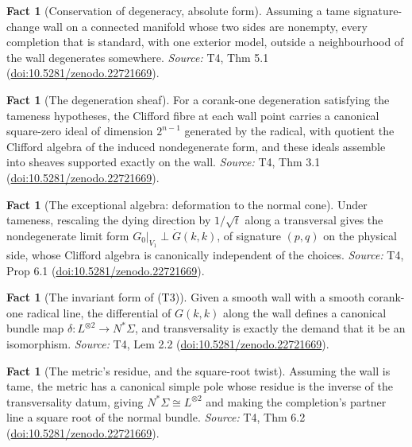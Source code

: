 \documentclass[11pt]{article}
\theoremstyle{definition}
\newtheorem{fact}[theorem]{Fact}
\theoremstyle{plain}
\providecommand{\Sig}{}\renewcommand{\Sig}{\Sigma}
\providecommand{\shL}{}\renewcommand{\shL}{L}
\begin{document}
\begin{fact}[Conservation of degeneracy, absolute form]\label{c:sheaf.conservation-degeneracy-absolute-form}
Assuming a tame signature-change wall on a connected manifold whose two sides are nonempty, every completion that is standard, with one exterior model, outside a neighbourhood of the wall degenerates somewhere.
\emph{Source:} T4, Thm 5.1 (\href{https://doi.org/10.5281/zenodo.22721669}{doi:10.5281/zenodo.22721669}).
\end{fact}

\begin{fact}[The degeneration sheaf]\label{c:sheaf.degeneration-sheaf}
For a corank-one degeneration satisfying the tameness hypotheses, the Clifford fibre at each wall point carries a canonical square-zero ideal of dimension $2^{n-1}$ generated by the radical, with quotient the Clifford algebra of the induced nondegenerate form, and these ideals assemble into sheaves supported exactly on the wall.
\emph{Source:} T4, Thm 3.1 (\href{https://doi.org/10.5281/zenodo.22721669}{doi:10.5281/zenodo.22721669}).
\end{fact}

\begin{fact}[The exceptional algebra: deformation to the normal cone]\label{c:sheaf.exceptional-algebra-deformation-normal-cone}
Under tameness, rescaling the dying direction by $1/\sqrt{t}$ along a transversal gives the nondegenerate limit form $G_0|_{V_1} \perp \dot G(k,k)$, of signature $(p,q)$ on the physical side, whose Clifford algebra is canonically independent of the choices.
\emph{Source:} T4, Prop 6.1 (\href{https://doi.org/10.5281/zenodo.22721669}{doi:10.5281/zenodo.22721669}).
\end{fact}

\begin{fact}[The invariant form of (T3)]\label{c:sheaf.invariant-form-t3}
Given a smooth wall with a smooth corank-one radical line, the differential of $G(k,k)$ along the wall defines a canonical bundle map $\delta : \shL^{\otimes 2} \to N^*\Sig$, and transversality is exactly the demand that it be an isomorphism.
\emph{Source:} T4, Lem 2.2 (\href{https://doi.org/10.5281/zenodo.22721669}{doi:10.5281/zenodo.22721669}).
\end{fact}

\begin{fact}[The metric's residue, and the square-root twist]\label{c:sheaf.metrics-residue-square-root-twist}
Assuming the wall is tame, the metric has a canonical simple pole whose residue is the inverse of the transversality datum, giving $N^*\Sig \cong \shL^{\otimes 2}$ and making the completion's partner line a square root of the normal bundle.
\emph{Source:} T4, Thm 6.2 (\href{https://doi.org/10.5281/zenodo.22721669}{doi:10.5281/zenodo.22721669}).
\end{fact}
\end{document}
